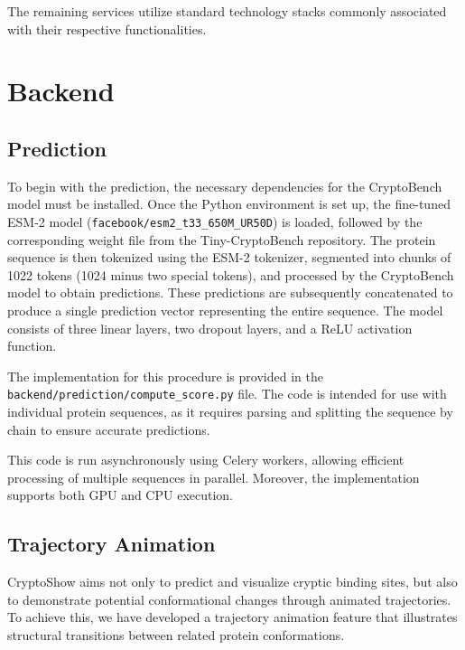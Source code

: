 The remaining services utilize standard technology stacks commonly associated with their respective functionalities.

\section{Backend}
\label{sec:backend}


\subsection{Prediction}
\label{sec:prediction-backend}

\sloppy
To begin with the prediction, the necessary dependencies for the CryptoBench model must be installed. Once the Python environment is set up, the fine-tuned ESM-2 model (\lstinline!facebook/esm2_t33_650M_UR50D!) is loaded, followed by the corresponding weight file from the Tiny-CryptoBench repository. The protein sequence is then tokenized using the ESM-2 tokenizer, segmented into chunks of 1022 tokens (1024 minus two special tokens), and processed by the CryptoBench model to obtain predictions. These predictions are subsequently concatenated to produce a single prediction vector representing the entire sequence. The model consists of three linear layers, two dropout layers, and a ReLU activation function.

\sloppy
The implementation for this procedure is provided in the \lstinline!backend/prediction/compute_score.py! file. The code is intended for use with individual protein sequences, as it requires parsing and splitting the sequence by chain to ensure accurate predictions.

This code is run asynchronously using Celery workers, allowing efficient processing of multiple sequences in parallel. Moreover, the implementation supports both GPU and CPU execution.

\subsection{Trajectory Animation}
\label{sec:trajectory}


CryptoShow aims not only to predict and visualize cryptic binding sites, but also to demonstrate potential conformational changes through animated trajectories. To achieve this, we have developed a trajectory animation feature that illustrates structural transitions between related protein conformations.

